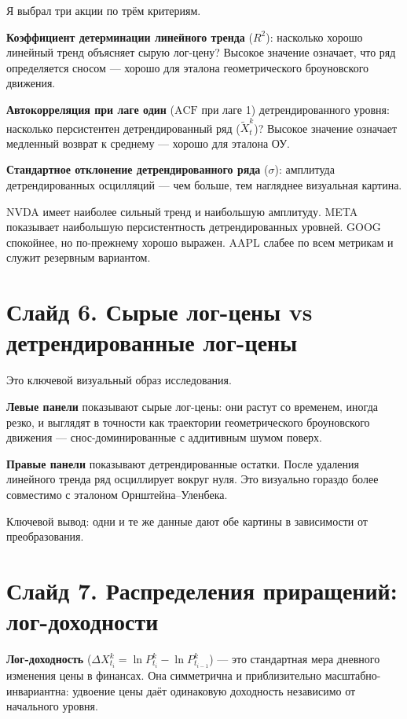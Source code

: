 \documentclass[12pt,a4paper]{article}
\begin{document}
Я выбрал три акции по трём критериям.

\textbf{Коэффициент детерминации линейного тренда} ($R^2$):
насколько хорошо линейный тренд объясняет сырую лог-цену?
Высокое значение означает, что ряд определяется сносом ---
хорошо для эталона геометрического броуновского движения.

\textbf{Автокорреляция при лаге один} ($\text{ACF}$ при лаге 1)
детрендированного уровня: насколько персистентен детрендированный ряд ($\widetilde{X}_t^k$)?
Высокое значение означает медленный возврат к среднему ---
хорошо для эталона ОУ.

\textbf{Стандартное отклонение детрендированного ряда} ($\sigma$):
амплитуда детрендированных осцилляций ---
чем больше, тем нагляднее визуальная картина.

NVDA имеет наиболее сильный тренд и наибольшую амплитуду.
META показывает наибольшую персистентность детрендированных уровней.
GOOG спокойнее, но по-прежнему хорошо выражен.
AAPL слабее по всем метрикам и служит резервным вариантом.

\section{Слайд 6. Сырые лог-цены vs детрендированные лог-цены}

Это ключевой визуальный образ исследования.

\textbf{Левые панели} показывают сырые лог-цены:
они растут со временем, иногда резко,
и выглядят в точности как траектории геометрического броуновского движения ---
снос-доминированные с аддитивным шумом поверх.

\textbf{Правые панели} показывают детрендированные остатки.
После удаления линейного тренда ряд осциллирует вокруг нуля.
Это визуально гораздо более совместимо с эталоном Орнштейна--Уленбека.

Ключевой вывод: одни и те же данные дают обе картины в зависимости от преобразования.

\section{Слайд 7. Распределения приращений: лог-доходности}

\textbf{Лог-доходность} ($\Delta X_{t_i}^k = \ln P_{t_i}^k - \ln P_{t_{i-1}}^k$) ---
это стандартная мера дневного изменения цены в финансах.
Она симметрична и приблизительно масштабно-инвариантна:
удвоение цены даёт одинаковую доходность независимо от начального уровня.
\end{document}
